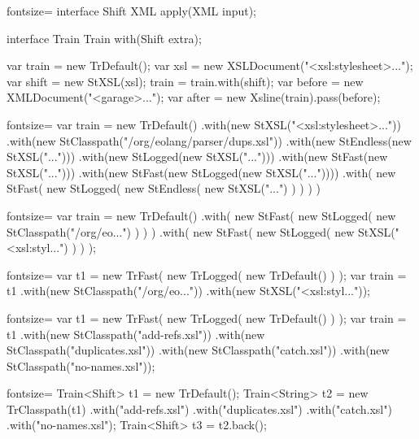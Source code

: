 \documentclass{article}
\begin{document}
\begin{ffcode*}{fontsize=\small}
interface Shift {
  XML apply(XML input);
}

interface Train {
  Train with(Shift extra);
}

var train = new TrDefault();
var xsl = new XSLDocument("<xsl:stylesheet>...");
var shift = new StXSL(xsl);
train = train.with(shift);
var before = new XMLDocument("<garage>...");
var after = new Xsline(train).pass(before);
\end{ffcode*}

\plush{}
\begin{ffcode*}{fontsize=\footnotesize}
var train = new TrDefault()
  .with(new StXSL("<xsl:stylesheet>..."))
  .with(new StClasspath("/org/eolang/parser/dups.xsl"))
  .with(new StEndless(new StXSL("...")))
  .with(new StLogged(new StXSL("...")))
  .with(new StFast(new StXSL("...")))
  .with(new StFast(new StLogged(new StXSL("..."))))
  .with(
    new StFast(
      new StLogged(
        new StEndless(
          new StXSL("...")
        )
      )
    )
  )
\end{ffcode*}

\begin{pptWide}{2}
\begin{ffcode*}{fontsize=\footnotesize}
var train = new TrDefault()
  .with(
    new StFast(
      new StLogged(
        new StClasspath("/org/eo...")
      )
    )
  )
  .with(
    new StFast(
      new StLogged(
        new StXSL("<xsl:styl...")
      )
    )
  );
\end{ffcode*}
\columnbreak
\begin{ffcode*}{fontsize=\small}
var t1 = new TrFast(
  new TrLogged(
    new TrDefault()
  )
);
var train = t1
  .with(new StClasspath("/org/eo..."))
  .with(new StXSL("<xsl:styl..."));
\end{ffcode*}
\end{pptWide}

\plush{}
\begin{pptWide}{2}
\begin{ffcode*}{fontsize=\footnotesize}
var t1 = new TrFast(
  new TrLogged(
    new TrDefault()
  )
);
var train = t1
  .with(new StClasspath("add-refs.xsl"))
  .with(new StClasspath("duplicates.xsl"))
  .with(new StClasspath("catch.xsl"))
  .with(new StClasspath("no-names.xsl"));
\end{ffcode*}
\columnbreak
\begin{ffcode*}{fontsize=\small}
Train<Shift> t1 = new TrDefault();
Train<String> t2 = new TrClasspath(t1)
  .with("add-refs.xsl")
  .with("duplicates.xsl")
  .with("catch.xsl")
  .with("no-names.xsl");
Train<Shift> t3 = t2.back();
\end{ffcode*}
\end{pptWide}
\end{document}
